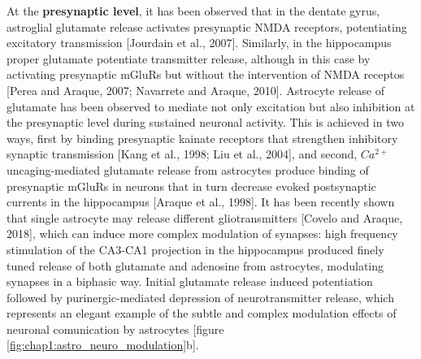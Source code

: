 At the \textbf{presynaptic level}, it has been observed that in the dentate gyrus, astroglial glutamate release activates presynaptic NMDA receptors, potentiating excitatory transmission [Jourdain et al., 2007].
Similarly, in the hippocampus proper glutamate potentiate transmitter release, although in this case by activating presynaptic mGluRs but without the intervention of NMDA receptos [Perea and Araque, 2007; Navarrete and Araque, 2010].
Astrocyte release of glutamate has been observed to mediate not only excitation but also inhibition at the presynaptic level during sustained neuronal activity.
This is achieved in two ways, first by binding presynaptic kainate receptors that strengthen inhibitory synaptic transmission [Kang et al., 1998; Liu et al., 2004], and second, $Ca^{2+}$ uncaging-mediated glutamate release from astrocytes produce binding of presynaptic mGluRs in neurons that in turn decrease evoked postsynaptic currents in the hippocampus [Araque et al., 1998].
It has been recently shown that single astrocyte may release different gliotransmitters [Covelo and Araque, 2018], which can induce more complex modulation of synapses: high frequency stimulation of the CA3-CA1 projection in the hippocampus produced finely tuned release of both glutamate and adenosine from astrocytes, modulating synapses in a biphasic way.
Initial glutamate release induced potentiation followed by purinergic-mediated depression of neurotransmitter release, which represents an elegant example of the subtle and complex modulation effects of neuronal comunication by astrocytes [figure \ref{fig:chap1:astro_neuro_modulation}b]. 

